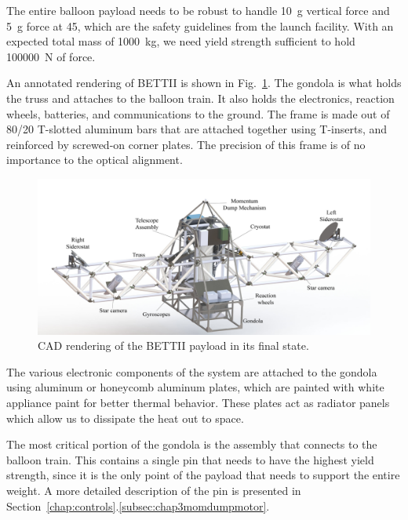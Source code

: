 The entire balloon payload needs to be robust to handle 10~g vertical force and 5~g force at \SI{45}{\deg}, which are the safety guidelines from the launch facility. With an expected total mass of \SI{1000}{\kilo\gram}, we need yield strength sufficient to hold \SI{100000}{\newton} of force. 

An annotated rendering of BETTII is shown in Fig.~\ref{fig:BETTIICAD}. The gondola is what holds the truss and attaches to the balloon train. It also holds the electronics, reaction wheels, batteries, and communications to the ground. The frame is made out of 80/20 T-slotted aluminum bars that are attached together using T-inserts, and reinforced by screwed-on corner plates. The precision of this frame is of no importance to the optical alignment. 


\begin{figure}[!ht]
	\centering
	\includegraphics[width=\textwidth]{Figures/BETTII-annotated.jpg} 
	\caption[BETTII Rendering]{CAD rendering of the BETTII payload in its final state.}
	\label{fig:BETTIICAD}
    \end{figure}



The various electronic components of the system are attached to the gondola using aluminum or honeycomb aluminum plates, which are painted with white appliance paint for better thermal behavior. These plates act as radiator panels which allow us to dissipate the heat out to space.

The most critical portion of the gondola is the assembly that connects to the balloon train. This contains a single pin that needs to have the highest yield strength, since it is the only point of the payload that needs to support the entire weight. A more detailed description of the pin is presented in Section~\ref{chap:controls}.\ref{subsec:chap3momdumpmotor}.

